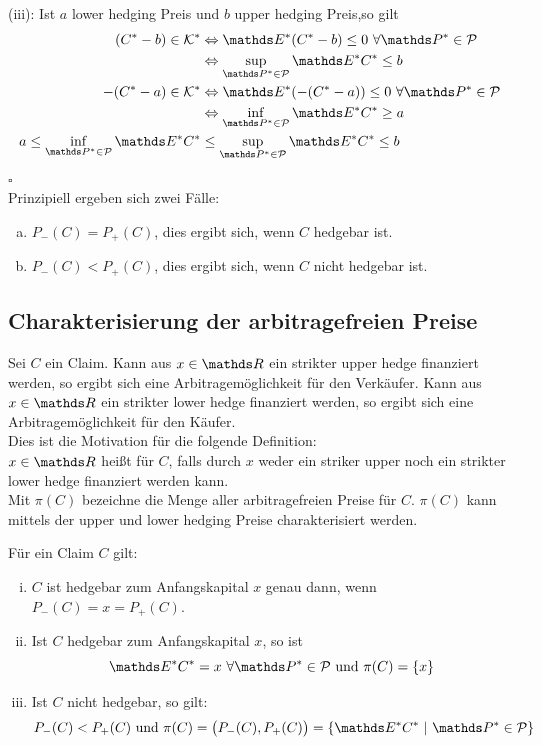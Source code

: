 (iii): Ist $a$ lower hedging Preis und $b$ upper hedging Preis,so gilt
\begin{equation*}
\begin{aligned}
	(C^*-b)\in \mc{K}^* &\Leftrightarrow \E^*(C^*-b)\le 0 ~\forall \Pw^*\in\mc{P}\\
	&\Leftrightarrow \sup\limits_{\Pw^*\in\mc{P}} \E^*C^*\le b\\
	-(C^*-a)\in\mc{K}^* &\Leftrightarrow \E^*(-(C^*-a))\le 0~\forall\Pw^*\in\mc{P}\\
	&\Leftrightarrow \inf\limits_{\Pw^*\in\mc{P}}\E^*C^*\ge a\\
	a\le \inf\limits_{\Pw^*\in\mc{P}}\E^*C^* &\le \sup\limits_{\Pw^*\in\mc{P}} \E^*C^* \le b
\end{aligned}
\end{equation*}
\hfill $\square$\\
Prinzipiell ergeben sich zwei Fälle:
\begin{enumerate}[(a)]
	\item $P_-(C)=P_+(C)$, dies ergibt sich, wenn $C$ hedgebar ist.
	\item $P_-(C)<P_+(C)$, dies ergibt sich, wenn $C$ nicht hedgebar ist.
\end{enumerate}


\subsection{Charakterisierung der arbitragefreien Preise}
\label{sub:arbitragefreier_preis}
Sei $C$ ein Claim.
Kann aus $x\in \R$ ein strikter upper hedge finanziert werden, so ergibt sich eine Arbitragemöglichkeit für den Verkäufer.
Kann aus $x\in\R$ ein strikter lower hedge finanziert werden, so ergibt sich eine Arbitragemöglichkeit für den Käufer.\\
Dies ist die Motivation für die folgende Definition:\\
$x\in \R$ heißt  für $C$, falls durch $x$ weder ein striker upper noch ein strikter lower hedge finanziert werden kann.\\
Mit $\pi(C)$ bezeichne die Menge aller arbitragefreien Preise für $C$.
$\pi(C)$ kann mittels der upper und lower hedging Preise charakterisiert werden.

Für ein Claim $C$ gilt:
\begin{enumerate}[(i)]
	\item $C$ ist hedgebar zum Anfangskapital $x$ genau dann, wenn $P_-(C)=x=P_+(C)$.
	\item Ist $C$ hedgebar zum Anfangskapital $x$, so ist
	\[
	\E^*C^*=x~\forall \Pw^*\in\mc{P} \text{ und } \pi(C)=\{x\}
	\]
	\item Ist $C$ nicht hedgebar, so gilt:
	\[
	P_-(C)<P_+(C)\text{ und } \pi(C)=\big(P_-(C),P_+(C)\big)=\penbrace{\E^*C^*~|~\Pw^*\in\mc{P}}
	\]
\end{enumerate}

